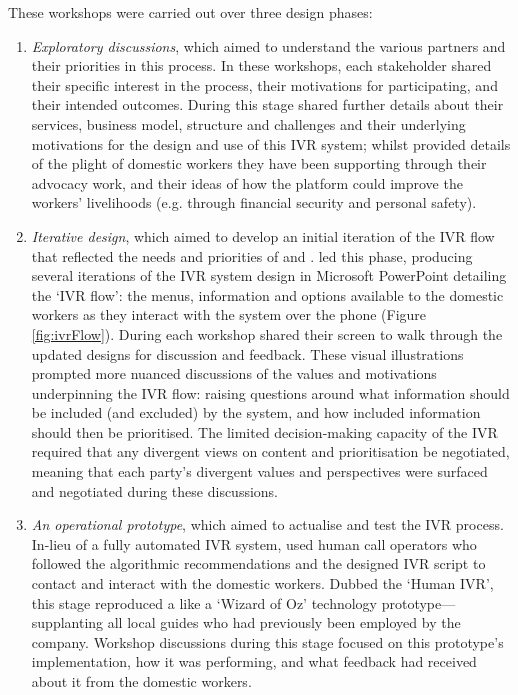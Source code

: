 These workshops were carried out over three design phases: 
\begin{enumerate}
\item \textit{Exploratory discussions}, which aimed to understand the various partners and their priorities in this process. In these workshops, each stakeholder shared their specific interest in the process, their motivations for participating, and their intended outcomes. During this stage \PC{} shared further details about their services, business model, structure and challenges and their underlying motivations for the design and use of this IVR system; whilst \NGO{} provided details of the plight of domestic workers they have been supporting through their advocacy work, and their ideas of how the platform could improve the workers' livelihoods (e.g. through financial security and personal safety). 

\item \textit{Iterative design}, which aimed to develop an initial iteration of the IVR flow that reflected the needs and priorities of \PC{} and \NGO{}. \PC{} led this phase, producing several iterations of the IVR system design in Microsoft PowerPoint detailing the `IVR flow': the menus, information and options available to the domestic workers as they interact with the system over the phone (Figure \ref{fig:ivrFlow}). During each workshop \PC{} shared their screen to walk through the updated designs for discussion and feedback. These visual illustrations prompted more nuanced discussions of the values and motivations underpinning the IVR flow: raising questions around what information should be included (and excluded) by the system, and how included information should then be prioritised. The limited decision-making capacity of the IVR required that any divergent views on content and prioritisation be negotiated, meaning that each party's divergent values and perspectives were surfaced and negotiated during these discussions.

\item \textit{An operational prototype}, which aimed to actualise and test the IVR process. In-lieu of a fully automated IVR system, \PC{} used human call operators who followed the algorithmic recommendations and the designed IVR script to contact and interact with the domestic workers. Dubbed the `Human IVR', this stage reproduced a like a `Wizard of Oz' technology prototype---supplanting all local guides who had previously been employed by the company. Workshop discussions during this stage focused on this prototype's implementation, how it was performing, and what feedback \PC{} had received about it from the domestic workers.

\end{enumerate}
